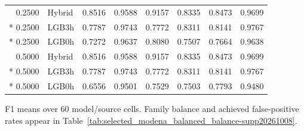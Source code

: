 \begin{longtable}{@{}rlrrrrrr@{}}
0.2500 & Hybrid & 0.8516 & 0.9588 & 0.9157 & 0.8335 & 0.8473 & 0.9699 \\*
0.2500 & LGB3h & 0.7787 & 0.9743 & 0.7772 & 0.8311 & 0.8141 & 0.9767 \\*
0.2500 & LGB0h & 0.7272 & 0.9637 & 0.8080 & 0.7507 & 0.7664 & 0.9638 \\
0.5000 & Hybrid & 0.8516 & 0.9588 & 0.9157 & 0.8335 & 0.8473 & 0.9699 \\*
0.5000 & LGB3h & 0.7787 & 0.9743 & 0.7772 & 0.8311 & 0.8141 & 0.9767 \\*
0.5000 & LGB0h & 0.6556 & 0.9501 & 0.7529 & 0.7503 & 0.7793 & 0.9480 \\
\end{longtable}
\noindent\footnotesize F1 means over 60 model/source cells. Family balance and achieved false-positive rates appear in Table~\ref{tab:selected_modena_balanced_balance-supp20261008}.
\par\endgroup
